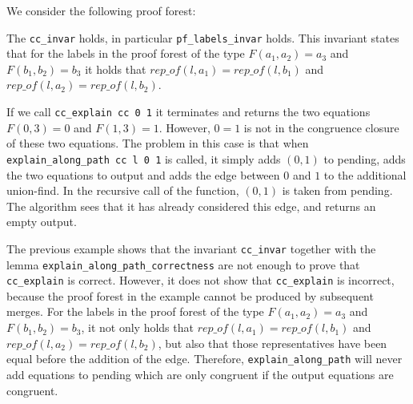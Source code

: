 \begin{exmp}
We consider the following proof forest:

\begin{center}
\end{center}

The \lstinline{cc_invar} holds, in particular \lstinline{pf_labels_invar} holds. This invariant states that for the labels in the proof forest of the type $F(a_1, a_2) = a_3$ and $F(b_1, b_2) = b_3$ it holds that $rep\_of(l, a_1) = rep\_of(l, b_1)$ and $rep\_of(l, a_2) = rep\_of(l, b_2)$.

If we call \lstinline{cc_explain cc 0 1} it terminates and returns the two equations $F(0,3) = 0$ and $F(1,3) = 1$.
However, $0 = 1$ is not in the congruence closure of these two equations.
The problem in this case is that when \lstinline{explain_along_path cc l 0 1} is called, it simply adds $(0, 1)$ to pending, adds the two equations to output and adds the edge between $0$ and $1$ to the additional union-find.
In the recursive call of the function, $(0,1)$ is taken from pending.
The algorithm sees that it has already considered this edge, and returns an empty output.
\end{exmp}

The previous example shows that the invariant \lstinline|cc_invar| together with the lemma \lstinline{explain_along_path_correctness} are not enough to prove that \lstinline{cc_explain} is correct. However, it does not show that \lstinline{cc_explain} is incorrect, because the proof forest in the example cannot be produced by subsequent merges. For the labels in the proof forest of the type $F(a_1, a_2) = a_3$ and $F(b_1, b_2) = b_3$, it not only holds that $rep\_of(l, a_1) = rep\_of(l, b_1)$ and $rep\_of(l, a_2) = rep\_of(l, b_2)$, but also that those representatives have been equal before the addition of the edge. Therefore, \lstinline{explain_along_path} will never add equations to pending which are only congruent if the output equations are congruent.

